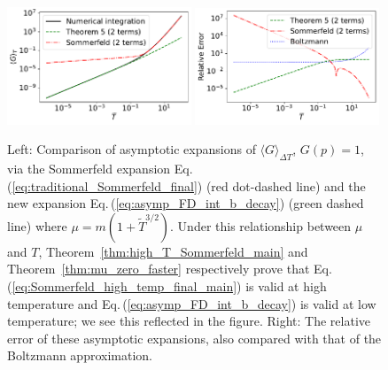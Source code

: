 \documentclass[sn-mathphys,Numbered]{sn-jnl}
\newcommand{\req}[1]{Eq.\,(\ref{#1})}
\newcommand{\rTh}[1]{Theorem~{\ref{#1}}}
\begin{document}
\begin{figure}%
\centering
\includegraphics[width=0.49\textwidth]{./plot/Sommerfeld_high_temp_comparison.pdf}
\includegraphics[width=0.49\textwidth]{./plot/Sommerfeld_high_temp_relative_error_comparison.pdf}
\caption{Left: Comparison of asymptotic expansions of $\langle G\rangle_{\Delta T}$, $G(p)=1$, via the Sommerfeld expansion \req{eq:traditional_Sommerfeld_final} (red dot-dashed line) and the new expansion \req{eq:asymp_FD_int_b_decay} (green dashed line) where $\mu=m(1+\widetilde{T}^{3/2})$. Under this relationship between $\mu$ and $T$, \rTh{thm:high_T_Sommerfeld_main} and \rTh{thm:mu_zero_faster} respectively prove that \req{eq:Sommerfeld_high_temp_final_main} is valid at high temperature and \req{eq:asymp_FD_int_b_decay} is valid at low temperature; we see this reflected in the figure. Right: The relative error of these asymptotic expansions, also compared with that of the Boltzmann approximation. }\label{fig:FD_avg_expansion_comparison_Sommerfeld}
\end{figure}
\end{document}
